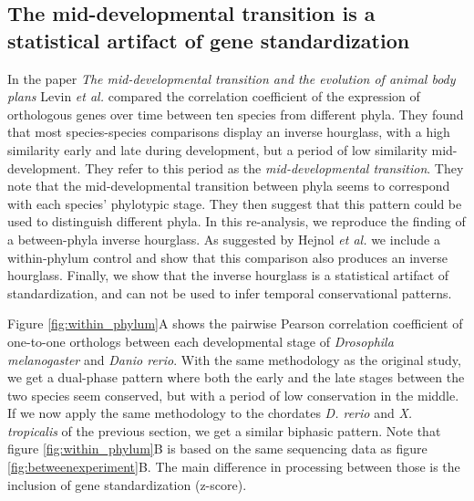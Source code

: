 \subsection{The mid-developmental transition is a statistical artifact of gene standardization} \label{subsection:levin}

In the paper \textit{The mid-developmental transition and the evolution of animal body plans}\cite{Levin2016} Levin \textit{et al.} compared the correlation coefficient of the expression of orthologous genes over time between ten species from different phyla. They found that most species-species comparisons display an inverse hourglass, with a high similarity early and late during development, but a period of low similarity mid-development. They refer to this period as the \textit{mid-developmental transition}. They note that the mid-developmental transition between phyla seems to correspond with each species' phylotypic stage. They then suggest that this pattern could be used to distinguish different phyla. In this re-analysis, we reproduce the finding of a between-phyla inverse hourglass. As suggested by Hejnol \textit{et al.}\cite{hejnol2016} we include a within-phylum control and show that this comparison also produces an inverse hourglass. Finally, we show that the inverse hourglass is a statistical artifact of standardization, and can not be used to infer temporal conservational patterns.

Figure \ref{fig:within_phylum}A shows the pairwise Pearson correlation coefficient of one-to-one orthologs between each developmental stage of \textit{Drosophila melanogaster} and \textit{Danio rerio}. With the same methodology as the original study, we get a dual-phase pattern where both the early and the late stages between the two species seem conserved, but with a period of low conservation in the middle. If we now apply the same methodology to the chordates \textit{D. rerio} and \textit{X. tropicalis} of the previous section, we get a similar biphasic pattern. Note that figure \ref{fig:within_phylum}B is based on the same sequencing data as figure \ref{fig:betweenexperiment}B. The main difference in processing between those is the inclusion of gene standardization (z-score).

